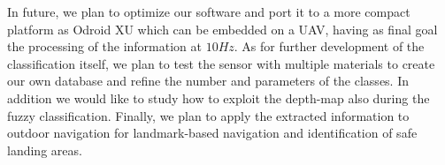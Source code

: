 \documentclass[a4paper, 10pt, conference]{ieeeconf}      %
\begin{document}
In future, we plan to optimize our software and port it to a more compact platform as Odroid XU which can be embedded on a UAV, having as final goal the processing of the information at $10Hz$.
As for further development of the classification itself, we plan to test the sensor with multiple materials to create our own database and refine the number and parameters of the classes.
In addition we would like to study how to exploit the depth-map also during the fuzzy classification.
Finally, we plan to apply the extracted information to outdoor navigation for landmark-based navigation and identification of safe landing areas.






























   













\end{document}
